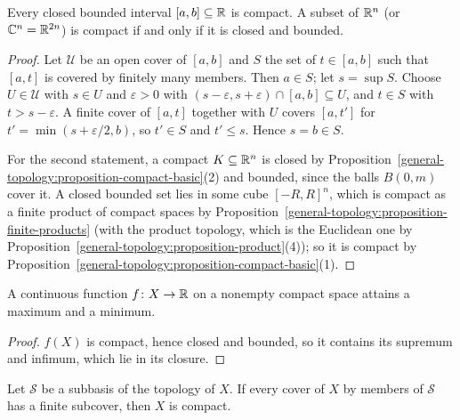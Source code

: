 \begin{theorem}\label{general-topology:theorem-heine-borel}
Every closed bounded interval $[a, b] \subseteq \mathbb{R}$ is compact. A subset of $\mathbb{R}^n$ (or $\mathbb{C}^n = \mathbb{R}^{2n}$) is compact if and only if it is closed
and bounded.
\end{theorem}

\begin{proof}
Let $\mathcal{U}$ be an open cover of $[a, b]$ and $S$ the set of $t \in [a, b]$ such that $[a, t]$ is covered by finitely many members. Then $a \in S$;
let $s = \sup S$. Choose $U \in \mathcal{U}$ with $s \in U$ and $\varepsilon > 0$ with $(s - \varepsilon, s + \varepsilon) \cap [a, b] \subseteq U$, and
$t \in S$ with $t > s - \varepsilon$. A finite cover of $[a, t]$ together with $U$ covers $[a, t']$ for
$t' = \min(s + \varepsilon/2, b)$, so $t' \in S$ and $t' \leq s$. Hence $s = b \in S$.

For the second statement, a compact
$K \subseteq \mathbb{R}^n$ is closed by Proposition~\ref{general-topology:proposition-compact-basic}(2) and bounded, since the balls $B(0, m)$ cover it. A
closed bounded set lies in some cube $[-R, R]^n$, which is compact as a finite product of compact spaces by Proposition~\ref{general-topology:proposition-finite-products} (with the product topology, which is the
Euclidean one by Proposition~\ref{general-topology:proposition-product}(4)); so it is compact by
Proposition~\ref{general-topology:proposition-compact-basic}(1).
\end{proof}

\begin{corollary}\label{general-topology:corollary-extreme-value}
A continuous function $f \colon X \to \mathbb{R}$ on a nonempty compact space attains a maximum and a minimum.
\end{corollary}

\begin{proof}
$f(X)$ is compact, hence closed and bounded, so it contains its supremum and infimum, which lie in its closure.
\end{proof}

\begin{lemma}\label{general-topology:lemma-alexander}
Let $\mathcal{S}$ be a subbasis of the topology of $X$. If every cover of $X$ by members of $\mathcal{S}$ has a finite subcover, then $X$ is compact.
\end{lemma}

